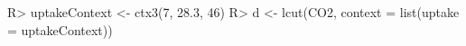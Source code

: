\begin{Schunk}
% --begin: "pbld2"
\begin{Sinput}
R> uptakeContext <- ctx3(7, 28.3, 46)
R> d <- lcut(CO2, context = list(uptake = uptakeContext))
\end{Sinput}
%
% --end: "pbld2"
\end{Schunk}
